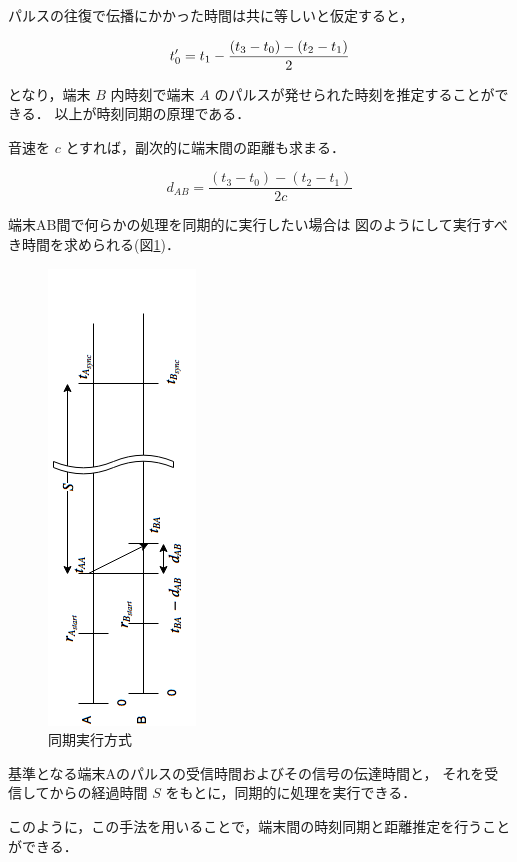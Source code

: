 パルスの往復で伝播にかかった時間は共に等しいと仮定すると，

$$
t_0' = t_1 - \frac{(t_3 - t_0) - (t_2 - t_1)}{2} \\
$$

となり，端末 $B$ 内時刻で端末 $A$ のパルスが発せられた時刻を推定することができる．
以上が時刻同期の原理である．

音速を $c$ とすれば，副次的に端末間の距離も求まる．

$$
d_{AB} = \frac{(t_3 - t_0) - (t_2 - t_1)}{2c}
$$

端末AB間で何らかの処理を同期的に実行したい場合は
図のようにして実行すべき時間を求められる(図\ref{fig:flowchart3})．

\begin{figure}[p]\centering
  \hspace{-2mm}\includegraphics[clip,height=1.5\hsize]{img/flowchart3.png}
  \caption{同期実行方式}\label{fig:flowchart3}
\end{figure}

基準となる端末Aのパルスの受信時間およびその信号の伝達時間と，
それを受信してからの経過時間 $S$ をもとに，同期的に処理を実行できる．

このように，この手法を用いることで，端末間の時刻同期と距離推定を行うことができる．
